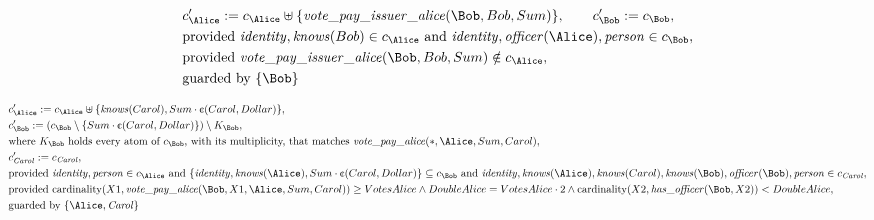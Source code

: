 \begin{align*}
&
c'_
{
\Alice
}
 := 
c_
{
\Alice
}
 \uplus 
\{
\mathit{\detokenize{
vote_pay_issuer_alice
}}
(
\Bob
,
Bob
,
Sum
)
\}
, \qquad 
c'_
{
\Bob
}
 := 
c_
{
\Bob
}
,\\
&
\text{provided } 
\mathit{\detokenize{
identity
}}
,
\mathit{\detokenize{
knows
}}
(
Bob
)
 \in c_
{
\Alice
}
 \text{ and } 
\mathit{\detokenize{
identity
}}
,
\mathit{\detokenize{
officer
}}
(
\Alice
)
,
\mathit{\detokenize{
person
}}
 \in c_
{
\Bob
}
,\\
&
\text{provided } 
\mathit{\detokenize{
vote_pay_issuer_alice
}}
(
\Bob
,
Bob
,
Sum
)
 \notin c_
{
\Alice
}
,\\
&
\text{guarded by } \{
\Bob
\}
\end{align*}

\begin{align*}
&
c'_
{
\Alice
}
 := 
c_
{
\Alice
}
 \uplus 
\{
\mathit{\detokenize{
knows
}}
(
Carol
)
,
Sum
\cdot
\text{\textcent}
(
Carol
,
Dollar
)
\}
,\\
&
c'_
{
\Bob
}
 := 
(c_
{
\Bob
}
 \setminus 
\{
Sum
\cdot
\text{\textcent}
(
Carol
,
Dollar
)
\}
) \setminus K_
{
\Bob
}
,\\
&
\text{where } K_
{
\Bob
}
 \text{ holds every atom of } c_
{
\Bob
}
 \text{, with its multiplicity, that matches } 
\mathit{\detokenize{
vote_pay_alice
}}
(
\ast
,
\Alice
,
Sum
,
Carol
)
,\\
&
c'_
{
\mathit{Carol}
}
 := 
c_
{
\mathit{Carol}
}
,\\
&
\text{provided } 
\mathit{\detokenize{
identity
}}
,
\mathit{\detokenize{
person
}}
 \in c_
{
\Alice
}
 \text{ and } 
\{
\mathit{\detokenize{
identity
}}
,
\mathit{\detokenize{
knows
}}
(
\Alice
)
,
Sum
\cdot
\text{\textcent}
(
Carol
,
Dollar
)
\}
 \subseteq c_
{
\Bob
}
 \text{ and } 
\mathit{\detokenize{
identity
}}
,
\mathit{\detokenize{
knows
}}
(
\Alice
)
,
\mathit{\detokenize{
knows
}}
(
Carol
)
,
\mathit{\detokenize{
knows
}}
(
\Bob
)
,
\mathit{\detokenize{
officer
}}
(
\Bob
)
,
\mathit{\detokenize{
person
}}
 \in c_
{
\mathit{Carol}
}
,\\
&
\text{provided } 
\mathrm{cardinality}(
X1
,
\mathit{\detokenize{
vote_pay_alice
}}
(
\Bob
,
X1
,
\Alice
,
Sum
,
Carol
)
)
\ge
VotesAlice
\land
DoubleAlice
=
VotesAlice
\cdot
2
\land
\mathrm{cardinality}(
X2
,
\mathit{\detokenize{
has_officer
}}
(
\Bob
,
X2
)
)
<
DoubleAlice
,\\
&
\text{guarded by } \{
\Alice
,
\mathit{Carol}
\}
\end{align*}
